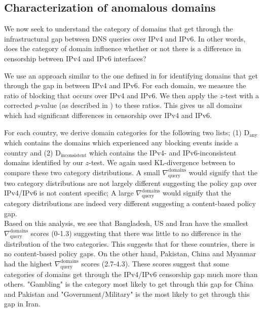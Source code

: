 \subsection{Characterization of anomalous domains}
\label{sec:infrastructure:domains}
We now seek to understand the category of domains that get through the
infrastructural gap between DNS queries over IPv4 and IPv6. In other words,
does the category of domain influence whether or not there is a difference in
censorship between IPv4 and IPv6 interfaces?

We use an approach similar to the one defined in 
for identifying domains that get through the gap in between IPv4 and IPv6. For
each domain, we measure the ratio of blocking that occurs over IPv4 and IPv6. We
then apply the $z$-test with a corrected $p$-value (as described in
) to these ratios. This gives us all domains which
had significant differences in censorship over IPv4 and IPv6.

For each country, we derive domain categories for the following two lists; (1)
$\text{D}_{\text{any}}$ which contains the domains which experienced any
blocking events inside a country and (2) $\text{D}_{\text{inconsistent}}$ which
contains the IPv4- and IPv6-inconsistent domains identified by our $z$-test. We
again used KL-divergence between to compare these two category distributions. A
small $\nabla_{\text{query}}^{\text{domains}}$ would signify that the two
category distributions are not largely different suggesting the policy gap over
IPv4/IPv6 is not content specific; A large
$\nabla_{\text{query}}^{\text{domains}}$ would signify that the category
distributions are indeed very different suggesting a content-based policy gap.
\\
Based on this analysis, we see that Bangladesh, US and Iran have the smallest
$\nabla_{\text{query}}^{\text{domains}}$ scores (0-1.3) suggesting that there
was little to no difference in the distribution of the two categories. This
suggests that for these countries, there is no content-based policy gaps. On the
other hand, Pakistan, China and Myanmar had the highest
$\nabla_{\text{query}}^{\text{domains}}$ scores (2.7-4.3). These scores suggest
that some categories of domains get through the IPv4/IPv6 censorship gap much
more than others. "Gambling" is the category most likely to get through this gap
for China and Pakistan and "Government/Military" is the most likely to get
through this gap in Iran. 
